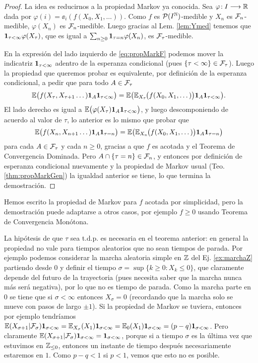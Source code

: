 \begin{proof}
La idea es reducirnos a la propiedad Markov ya conocida.
Sea $\varphi\!:I\longrightarrow\mathbb{R}$ dada por $\varphi(i)=\ee_i(f(X_0,X_1,\dotsc))$.
Como $f$ es $\mathcal{P}(I^{\mathbb{N}})$-medible y $X_n$ es $\mathcal{F}_n$-medible, $\varphi(X_n)$ es $\mathcal{F}_n$-medible.
Luego gracias al Lem. \ref{lem:Ymed} tenemos que $\mathbf{1}_{\tau<\infty}\varphi(X_\tau)$, que es igual a $\sum_{n\geq0}\mathbf{1}_{\tau=n}\varphi(X_n)$, es $\mathcal{F}_\tau$-medible.

En la expresión del lado izquierdo de \eqref{eq:propMarkF} podemos mover la indicatriz $\mathbf{1}_{\tau<\infty}$ adentro de la esperanza condicional (pues $\{\tau<\infty\}\in\mathcal{F}_\tau$).
Luego la propiedad que queremos probar es equivalente, por definición de la esperanza condicional, a pedir que para todo $A\in\mathcal{F}_\tau$
\[\mathbb{E}\big(f(X_{\tau},X_{\tau+1}\dotsc)\mathbf{1}_{A}\mathbf{1}_{\tau<\infty}\big)=\mathbb{E}\big(\mathbb{E}_{X_\tau}\hspace{-0.1em}\big(f(X_0,X_1,\dotsc)\big)\mathbf{1}_{A}\mathbf{1}_{\tau<\infty}\big).\]
El lado derecho es igual a $\mathbb{E}\big(\varphi(X_\tau)\mathbf{1}_{A}\mathbf{1}_{\tau<\infty}\big)$, y luego descomponiendo de acuerdo al valor de $\tau$, lo anterior es lo mismo que probar que 
\[\mathbb{E}\big(f(X_{n},X_{n+1}\dotsc)\mathbf{1}_{A}\mathbf{1}_{\tau=n}\big)=\mathbb{E}\big(\mathbb{E}_{X_n}\hspace{-0.1em}\big(f(X_0,X_1,\dotsc)\big)\mathbf{1}_{A}\mathbf{1}_{\tau=n}\big)\]
para cada $A\in\mathcal{F}_\tau$ y cada $n\geq0$, gracias a que $f$ es acotada y el Teorema de Convergencia Dominada.
Pero $A\cap\{\tau=n\}\in\mathcal{F}_n$, y entonces por definición de esperanza condicional nuevamente y la propiedad de Markov usual (Teo. \ref{thm:propMarkGen}) la igualdad anterior se tiene, lo que termina la demostración.
\end{proof}

\begin{rem}
Hemos escrito la propiedad de Markov para $f$ acotada por simplicidad, pero la demostración puede adaptarse a otros casos, por ejemplo $f\geq0$ usando Teorema de Convergencia Monótona.
\end{rem}

\begin{ex}
La hipótesis de que $\tau$ sea t.d.p. es necesaria en el teorema anterior: en general la propiedad no vale para tiempos aleatorios que no sean tiempos de parada.
Por ejemplo podemos considerar la marcha aleatoria simple en $\mathbb{Z}$ del Ej. \ref{ex:marchaZ} partiendo desde $0$ y definir el tiempo $\sigma=\sup\{k\geq0\!:X_k\leq0\}$, que claramente depende del futuro de la trayectoria (pues necesita saber que la marcha nunca más será negativa), por lo que no es tiempo de parada.
Como la marcha parte en $0$ se tiene que si $\sigma<\infty$ entonces $X_\sigma=0$ (recordando que la marcha solo se mueve con pasos de largo $\pm1$).
Si la propiedad de Markov se tuviera, entonces por ejemplo tendríamos $\mathbb{E}(X_{\sigma+1}|\mathcal{F}_\sigma)\mathbf{1}_{\sigma<\infty}=\mathbb{E}_{X_\sigma}(X_{1})\mathbf{1}_{\sigma<\infty}=\mathbb{E}_{0}(X_{1})\mathbf{1}_{\sigma<\infty}=(p-q)\mathbf{1}_{\sigma<\infty}$.
Pero claramente $\mathbb{E}(X_{\sigma+1}|\mathcal{F}_\sigma)\mathbf{1}_{\sigma<\infty}=\mathbf{1}_{\sigma<\infty}$, porque si a tiempo $\sigma$ es la última vez que estuvimos en $\mathbb{Z}_{\leq0}$, entonces un instante de tiempo después necesariamente estaremos en $1$.
Como $p-q<1$ si $p<1$, vemos que esto no es posible.
\end{ex}

